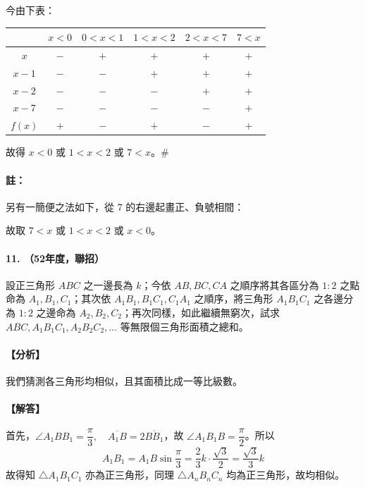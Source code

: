 今由下表：
\begin{center}
\renewcommand{\arraystretch}{1.2}
\begin{tabular}{c|c|c|c|c|c}
& $x<0$ & $0<x<1$ & $1<x<2$ & $2<x<7$ & $7<x$ \\ \hline
$x$ & $-$ & $+$ & $+$ & $+$ & $+$ \\
$x-1$ & $-$ & $-$ & $+$ & $+$ & $+$ \\
$x-2$ & $-$ & $-$ & $-$ & $+$ & $+$ \\
$x-7$ & $-$ & $-$ & $-$ & $-$ & $+$ \\ \hline
$f(x)$ & $+$ & $-$ & $+$ & $-$ & $+$
\end{tabular}
\end{center}
故得 $x<0$ 或 $1<x<2$ 或 $7<x$。\hfill$\#$

\paragraph{註：} 另有一簡便之法如下，從 7 的右邊起畫正、負號相間：
\begin{center}
\end{center}
故取 $7<x$ 或 $1<x<2$ 或 $x<0$。

\paragraph{11. （52年度，聯招）}
設正三角形 $ABC$ 之一邊長為 $k$；今依 $AB, BC, CA$ 之順序將其各區分為 $1:2$ 之點命為 $A_1, B_1, C_1$；其次依 $A_1 B_1, B_1 C_1, C_1 A_1$ 之順序，將三角形 $A_1 B_1 C_1$ 之各邊分為 $1:2$ 之邊命為 $A_2, B_2, C_2$；再次同樣，如此繼續無窮次，試求 $ABC, A_1 B_1 C_1, A_2 B_2 C_2, \dots$ 等無限個三角形面積之總和。

\paragraph{【分析】}
我們猜測各三角形均相似，且其面積比成一等比級數。

\paragraph{【解答】}
首先，$\angle A_1 B B_1 = \dfrac{\pi}{3}, \quad \overline{A_1 B} = 2\overline{BB_1}$，故 $\angle A_1 B_1 B = \dfrac{\pi}{2}$。所以
\[ A_1 B_1 = A_1 B \sin\dfrac{\pi}{3} = \dfrac{2}{3}k \cdot \dfrac{\sqrt{3}}{2} = \dfrac{\sqrt{3}}{3}k \]
故得知 $\triangle A_1 B_1 C_1$ 亦為正三角形，同理 $\triangle A_n B_n C_n$ 均為正三角形，故均相似。

